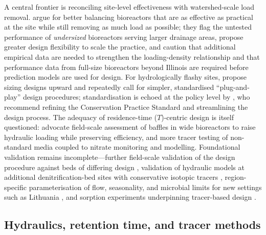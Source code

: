 \documentclass[11pt]{article}
\begin{document}
A central frontier is reconciling site-level effectiveness with watershed-scale
load removal. \textcite{Christianson2026} argue for better balancing bioreactors
that are as effective as practical at the site while still removing as much load
as possible; they flag the untested performance of \emph{undersized} bioreactors
serving larger drainage areas, propose greater design flexibility to scale the
practice, and caution that additional empirical data are needed to strengthen the
loading-density relationship and that performance data from full-size bioreactors
beyond Illinois are required before prediction models are used for design. For
hydrologically flashy sites, \textcite{Dougherty2020b} propose sizing designs
upward and repeatedly call for simpler, standardised ``plug-and-play'' design
procedures; standardisation is echoed at the policy level by
\textcite{Christianson2021}, who recommend refining the Conservation Practice
Standard and streamlining the design process. The adequacy of residence-time
($T$)-centric design is itself questioned: \textcite{deOliveira2023} advocate
field-scale assessment of baffles in wide bioreactors to raise hydraulic loading
while preserving efficiency, and more tracer testing of non-standard media
coupled to nitrate monitoring and modelling. Foundational validation remains
incomplete---further field-scale validation of the design procedure against beds
of differing design \parencite{Christianson2013}, validation of hydraulic models
at additional denitrification-bed sites with conservative isotopic tracers
\parencite{Ghane2015}, region-specific parameterisation of flow, seasonality, and
microbial limits for new settings such as Lithuania \parencite{Povilaitis2020},
and sorption experiments underpinning tracer-based design \parencite{Ghane2019}.

\subsection{Hydraulics, retention time, and tracer methods}
\end{document}
